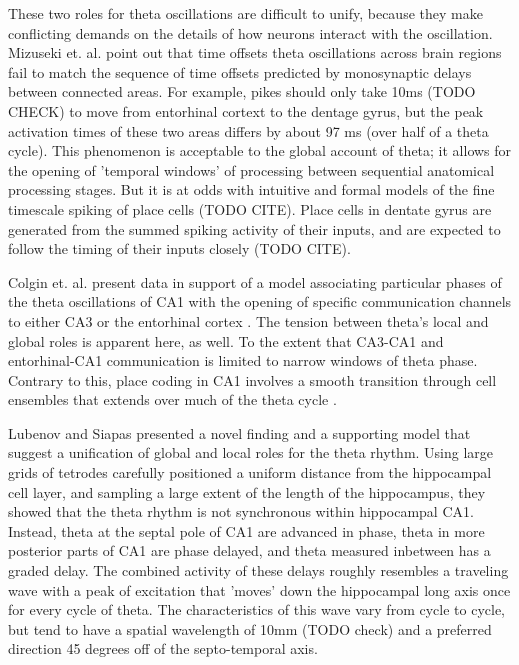 \documentclass[10pt]{article}
\begin{document}
These two roles for theta oscillations are difficult to unify, because they make conflicting demands on the details of how neurons interact with the oscillation.  Mizuseki et. al. \cite{Mizuseki2009} point out that time offsets theta oscillations across brain regions fail to match the sequence  of time offsets predicted by monosynaptic delays between connected areas.  For example, pikes should only take 10ms (TODO CHECK) to move from entorhinal cortext to the dentage gyrus, but the peak activation times of these two areas differs by about 97 ms (over half of a theta cycle).  This phenomenon is acceptable to the global account of theta; it allows for the opening of 'temporal windows' of processing between sequential anatomical processing stages.  But it is at odds with intuitive and formal models of the fine timescale spiking of place cells (TODO CITE).  Place cells in dentate gyrus are generated from the summed spiking activity of their inputs, and are expected to follow the timing of their inputs closely (TODO CITE).

Colgin et. al. present data in support of a model associating particular phases of the theta oscillations of CA1 with the opening of specific communication channels to either CA3 or the entorhinal cortex \cite{Colgin2009}.  The tension between theta's local and global roles is apparent here, as well. To the extent that CA3-CA1 and entorhinal-CA1 communication is limited to narrow windows of theta phase. Contrary to this, place coding in CA1 involves a smooth transition through cell ensembles that extends over much of the theta cycle \cite{Foster, Gupta TODO}.

Lubenov and Siapas \cite{TODO} presented a novel finding and a supporting model that suggest a unification of global and local roles for the theta rhythm. Using large grids of tetrodes carefully positioned a uniform distance from the hippocampal cell layer, and sampling a large extent of the length of the hippocampus, they showed that the theta rhythm is not synchronous within hippocampal CA1. Instead, theta at the septal pole of CA1 are advanced in phase, theta in more posterior parts of CA1 are phase delayed, and theta measured inbetween has a graded delay. The combined activity of these delays roughly resembles a traveling wave with a peak of excitation that 'moves' down the hippocampal long axis once for every cycle of theta. The characteristics of this wave vary from cycle to cycle, but tend to have a spatial wavelength of 10mm (TODO check) and a preferred direction 45 degrees off of the septo-temporal axis.
\end{document}
